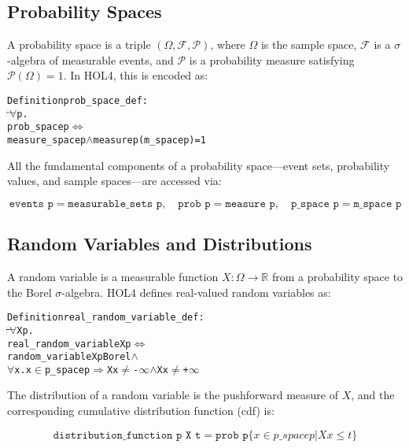\subsection{Probability Spaces}

A probability space is a triple $(\Omega, \mathscr{F}, \mathscr{P})$, where $\Omega$ is the sample space, $\mathscr{F}$ is a $\sigma$-algebra of measurable events, and $\mathscr{P}$ is a probability measure satisfying $\mathscr{P}(\Omega) = 1$. In HOL4, this is encoded as:

\begin{hol}
\begin{alltt}
Definition prob\_space\_def :
\(\!\!\!{\turn}\!\!\!\!\) \(\forall\)p.
prob\_space p \({\Leftrightarrow}\)
measure\_space p \(\land\) measure p (m\_space p) = 1
\end{alltt}
\end{hol}

All the fundamental components of a probability space—event sets, probability values, and sample spaces—are accessed via:

\[
\texttt{events p} = \texttt{measurable\_sets p},\quad
\texttt{prob p} = \texttt{measure p},\quad
\texttt{p\_space p} = \texttt{m\_space p}
\]

\subsection{Random Variables and Distributions}

A random variable is a measurable function $X : \Omega \rightarrow \mathbb{R}$ from a probability space to the Borel $\sigma$-algebra. HOL4 defines real-valued random variables as:

\begin{hol}
\begin{alltt}
Definition real\_random\_variable\_def :
\(\!\!\!{\turn}\!\!\!\!\) \(\forall\)X p.
real\_random\_variable X p \({\Leftrightarrow}\)
random\_variable X p Borel \(\land\)
\(\forall\)x. x \(\in\) p\_space p \(\Rightarrow\) X x \(\ne\) -\(\infty\) \(\land\) X x \(\ne\) +\(\infty\)
\end{alltt}
\end{hol}


The distribution of a random variable is the pushforward measure of $X$, and the corresponding cumulative distribution function (cdf) is:

\[
\texttt{distribution\_function p X t} = \texttt{prob p} \{x \in p\_space p | X x \leq t\}
\]

